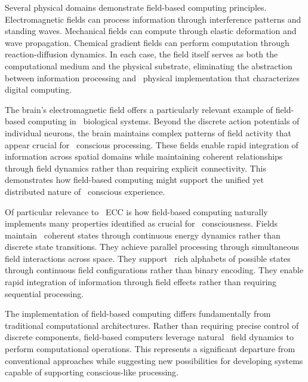 Several physical domains demonstrate field-based computing principles.~ Electromagnetic fields can process information through interference patterns and standing waves. Mechanical fields can compute through elastic deformation and wave propagation. Chemical gradient fields can perform computation through reaction-diffusion dynamics. In each case, the field itself serves as both the computational medium and the physical substrate, eliminating the abstraction between information processing and~ physical implementation that characterizes~ digital computing.

The brain's electromagnetic field offers a particularly relevant example of field-based computing in~ biological systems. Beyond the discrete action potentials of individual neurons, the brain maintains complex patterns of field activity that appear crucial for~ conscious processing. These fields enable rapid integration of information across spatial domains while maintaining coherent relationships through field dynamics rather than requiring explicit connectivity. This demonstrates how field-based computing might support the unified yet distributed nature of~ conscious experience.

Of particular relevance to~ ECC is how field-based computing naturally implements many properties identified as crucial for~ consciousness. Fields maintain~ coherent states through continuous energy dynamics rather than discrete state transitions. They achieve parallel processing through simultaneous field interactions across space. They support~ rich alphabets of possible states through continuous field configurations rather than binary encoding. They enable rapid integration of information through field effects rather than requiring sequential processing.

The implementation of field-based computing differs fundamentally from traditional computational architectures. Rather than requiring precise control of discrete components, field-based computers leverage natural~ field dynamics to perform computational operations. This represents a significant departure from conventional approaches while suggesting new possibilities for developing systems capable of supporting conscious-like processing.

